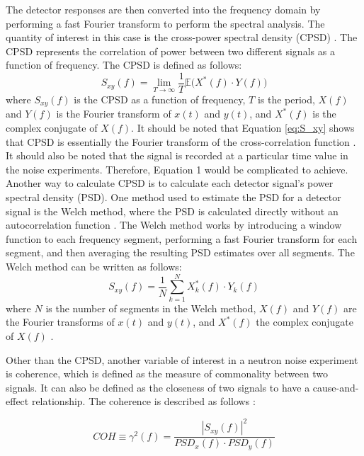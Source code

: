 The detector responses are then converted into the frequency domain by performing a fast Fourier transform to perform the spectral analysis. The quantity of interest in this case is the cross-power spectral density (CPSD) \cite{ambrozicNoiseAnalysisTechniques2020}. The CPSD represents the correlation of power between two different signals as a function of frequency. The CPSD is defined as follows:
\begin{equation}
    S_{xy}(f) = \lim_{T \rightarrow \infty} \frac{1}{T} \mathbb{E} \bigg( X^*(f) \cdot Y(f) \bigg)
    \label{eq:S_xy}
\end{equation}
where $S_{xy} (f)$ is the CPSD as a function of frequency, $T$ is the period, $X(f)$ and $Y(f)$ is the Fourier transform of $x(t)$ and $y(t)$, and $X^* (f)$ is the complex conjugate of $X(f)$. It should be noted that Equation \ref{eq:S_xy} shows that CPSD is essentially the Fourier transform of the cross-correlation function \cite{thiePowerReactorNoise1981}. It should also be noted that the signal is recorded at a particular time value in the noise experiments. Therefore, Equation 1 would be complicated to achieve. Another way to calculate CPSD is to calculate each detector signal’s power spectral density (PSD). One method used to estimate the PSD for a detector signal is the Welch method, where the PSD is calculated directly without an autocorrelation function \cite{welchDirectDigitalMethod1961}. The Welch method works by introducing a window function to each frequency segment, performing a fast Fourier transform for each segment, and then averaging the resulting PSD estimates over all segments. The Welch method can be written as follows:
\begin{equation}
    S_{xy}(f) = \frac{1}{N} \sum_{k=1}^{N} X_k^*(f) \cdot Y_k(f)
\end{equation}
where $N$ is the number of segments in the Welch method, $X(f)$ and $Y(f)$ are the Fourier transforms of $x(t)$ and $y(t)$, and $X^* (f)$ the complex conjugate of $X(f)$ \cite{ambrozicNoiseAnalysisTechniques2020}.

Other than the CPSD, another variable of interest in a neutron noise experiment is coherence, which is defined as the measure of commonality between two signals. It can also be defined as the closeness of two signals to have a cause-and-effect relationship. The coherence is described as follows \cite{fryAnalysisNeutrondensityOscillations1975}:

\begin{equation}
    COH \equiv \gamma^2 (f) = \frac{|S_{xy} (f)|^2}{PSD_x (f) \cdot PSD_y (f)}
    \label{eq:COH}
\end{equation}

